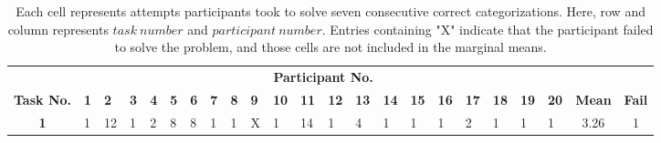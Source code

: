 \begin{table}[t]
\centering
\caption{Each cell represents attempts participants took to solve seven consecutive correct categorizations. Here, row and column represents $task~ number$ and $participant ~ number$. Entries containing "X" indicate that the participant failed to solve the problem, and those cells are not included in the marginal means. \citep{fleuret2011comparing}}
\vspace{5mm}

\small
\begin{adjustbox}{width=\textwidth}
\begin{tabular}{|c|llllllllllllllllllll|c|c|}
\hline 
\multicolumn{1}{|l|}{} & \multicolumn{20}{c}{\textbf{Participant No.}}  & \multicolumn{1}{|l|}{}   & \multicolumn{1}{|l|}{}  \\ \cline{2-21}
\textbf{Task No.}    & \textbf{1}             & \textbf{2}                                 & \textbf{3}                                 & \textbf{4}                                 & \textbf{5}                                 & \textbf{6}                                 & \textbf{7}             & \textbf{8}                                 & \textbf{9}                                 & \textbf{10}                                & \textbf{11}                                & \textbf{12}                                & \textbf{13}                                & \textbf{14}                                & \textbf{15}                                & \textbf{16}                                & \textbf{17}                                & \textbf{18}                                & \textbf{19}                                & \textbf{20}                                & \multicolumn{1}{|l|}{\multirow{-2}{*}{\textbf{Mean}}} & \multicolumn{1}{|l|}{\multirow{-2}{*}{\textbf{Fail}}} \\ \hline
\textbf{1}           & {\color{blue} 1}  & {\color{blue} 12}                     & {\color{blue} 1}                      & {\color{blue} 2}                      & {\color{blue} 8}                      & {\color{blue} 8}                      & {\color{blue} 1}  & {\color{blue} 1}                      & {\color{red} X} & {\color{blue} 1}                      & {\color{blue} 14}                     & {\color{blue} 1}                      & {\color{blue} 4}                      & {\color{blue} 1}                      & {\color{blue} 1}                      & {\color{blue} 1}                      & {\color{blue} 2}                      & {\color{blue} 1}                      & {\color{blue} 1}                      & {\color{blue} 1}                      & 3.26                                                & 1                                                   \\

\end{tabular}
\end{adjustbox}
\end{table}
